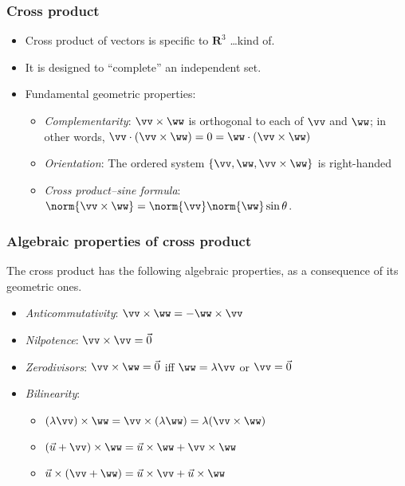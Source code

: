 \documentclass[11pt,ignorenonframetext,xcolor={svgnames},aspectratio=169]{beamer}
\begin{document}
\begin{frame}\frametitle{Cross product}

\begin{itemize}

\item
  Cross product of vectors is specific to $\mathbf{R}^3$ \ldots kind of.
\item
  It is designed to ``complete'' an independent set.
\end{itemize}

\begin{itemize}
\item
  Fundamental geometric properties:

  \begin{itemize}
  \item
    \emph{Complementarity}: $\vv \times \ww$ is orthogonal to each of
    $\vv$ and $\ww$; in other words,
    $\vv \cdot (\vv \times \ww) = 0 = \ww \cdot (\vv \times \ww)$
    \pause
  \item
    \emph{Orientation}: The ordered system
    $\{ \vv, \ww, \vv \times \ww \}$ is right-handed
    \pause
  \item
    \emph{Cross product--sine formula}:
    $\norm{\vv \times \ww} = \norm{\vv} \norm{\ww} \sin{\theta}$.
  \end{itemize}
\end{itemize}

\end{frame}

\begin{frame}\frametitle{Algebraic properties of cross product}

The cross product has the following algebraic properties, as a
consequence of its geometric ones.

\begin{itemize}
\item
  \emph{Anticommutativity}: $\vv \times \ww = -\ww \times \vv$
\item
  \emph{Nilpotence}: $\vv \times \vv = \vec{0}$
\item
  \emph{Zerodivisors}: $\vv \times \ww = \vec{0}$ iff
  $\ww = \lambda \vv$ or $\vv = \vec{0}$
\item
  \emph{Bilinearity}:

  \begin{itemize}
  \item
    $(\lambda \vv) \times \ww = \vv \times (\lambda \ww) = \lambda (\vv \times \ww)$
  \item
    $(\vec{u} + \vv) \times \ww = \vec{u} \times \ww + \vv \times \ww$
  \item
    $\vec{u} \times (\vv + \ww) = \vec{u} \times \vv + \vec{u} \times \ww$
  \end{itemize}
\end{itemize}

\end{frame}
\end{document}
